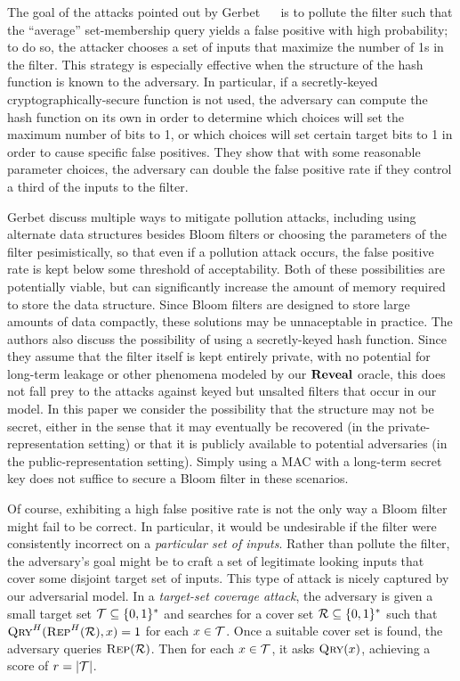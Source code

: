 %
The goal of the attacks pointed out by Gerbet \etal~~\cite{gerbet2015power} is
to pollute the filter such that the ``average'' set-membership query yields a
false positive with high probability; to do so, the attacker chooses a set of
inputs that maximize the number of 1s in the filter. This strategy is especially
effective when the structure of the hash function is known to the adversary. In
particular, if a secretly-keyed cryptographically-secure function is not used,
the adversary can compute the hash function on its own in order to determine
which choices will set the maximum number of bits to 1, or which choices will
set certain target bits to 1 in order to cause specific false positives. They
show that with some reasonable parameter choices, the adversary can double the
false positive rate if they control a third of the inputs to the filter.
%

Gerbet \etal discuss multiple ways to mitigate pollution attacks, including
using alternate data structures besides Bloom filters or choosing the parameters
of the filter pesimistically, so that even if a pollution attack occurs, the
false positive rate is kept below some threshold of acceptability. Both of these
possibilities are potentially viable, but can significantly increase the amount
of memory required to store the data structure. Since Bloom filters are designed
to store large amounts of data compactly, these solutions may be unnaceptable in
practice. The authors also discuss the possibility of using a secretly-keyed
hash function. Since they assume that the filter itself is kept entirely
private, with no potential for long-term leakage or other phenomena modeled by
our $\mathbf{Reveal}$ oracle, this does not fall prey to the attacks against keyed but
unsalted filters that occur in our model. In this paper we consider the
possibility that the structure may not be secret, either in the sense that it
may eventually be recovered (in the private-representation setting) or that it
is publicly available to potential adversaries (in the public-representation
setting). Simply using a MAC with a long-term secret key does not suffice to
secure a Bloom filter in these scenarios.

%
Of course, exhibiting a high false positive rate is not the only way a Bloom
filter might fail to be correct. In particular, it would be undesirable if the
filter were consistently incorrect on a \emph{particular set of inputs}. Rather
than pollute the filter, the adversary's goal might be to craft a set of
legitimate looking inputs that cover some disjoint target set of inputs.
%
This type of attack is nicely captured by our adversarial model.
%
In a \emph{target-set coverage attack}, the adversary is given a small target set
$\mathcal{T}\subseteq\{0,1\}^*$ and searches for a cover set $\mathcal{R}\subseteq\{0,1\}^*$
such that $\textnormal{\textsc{Qry}}^H(\textnormal{\textsc{Rep}}^H(\mathcal{R}),x)=1$ for each $x\in\mathcal{T}$.
%
Once a suitable cover set is found, the adversary queries $\textnormal{\textsc{Rep}}(\mathcal{R})$. Then
for each $x\in\mathcal{T}$, it asks $\textnormal{\textsc{Qry}}(x)$, achieving a score of $r = |\mathcal{T}|$.

